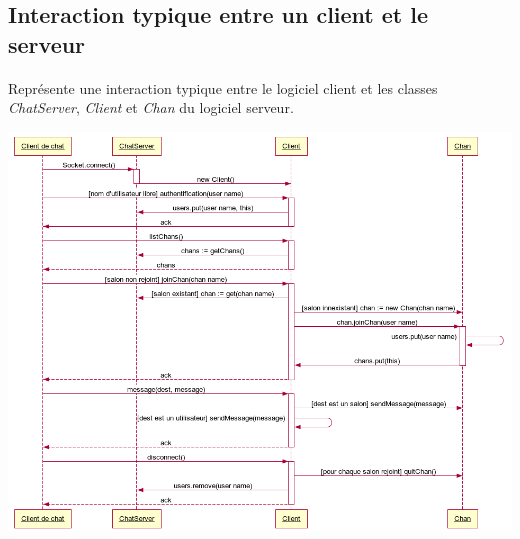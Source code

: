 \documentclass[a4paper]{article}
\begin{document}
 \subsection{Interaction typique entre un client et le serveur}

    \paragraph{}Représente une interaction typique entre le logiciel client et
les classes \textit{ChatServer}, \textit{Client} et \textit{Chan} du logiciel
serveur.

    \includegraphics[angle=90,width=1\linewidth]{sequence.png}
\end{document}
